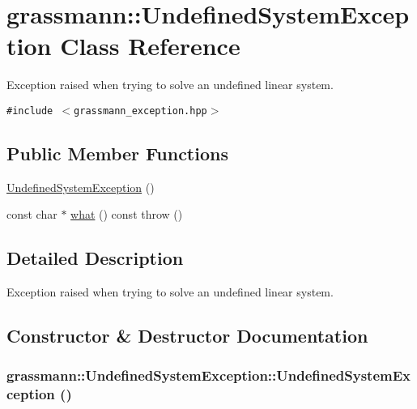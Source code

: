 \hypertarget{classgrassmann_1_1UndefinedSystemException}{
\section{grassmann::UndefinedSystemException Class Reference}
\label{classgrassmann_1_1UndefinedSystemException}
}
Exception raised when trying to solve an undefined linear system.  


{\tt \#include $<$grassmann\_\-exception.hpp$>$}

\subsection*{Public Member Functions}
\begin{CompactItemize}
\item 
\hyperlink{classgrassmann_1_1UndefinedSystemException_49bc0a7979db07f79413535926f5934e}{UndefinedSystemException} ()
\item 
const char $\ast$ \hyperlink{classgrassmann_1_1UndefinedSystemException_96dc5afc62b18e147c108dfd76b7a5d7}{what} () const   throw ()
\end{CompactItemize}


\subsection{Detailed Description}
Exception raised when trying to solve an undefined linear system. 

\subsection{Constructor \& Destructor Documentation}
\hypertarget{classgrassmann_1_1UndefinedSystemException_49bc0a7979db07f79413535926f5934e}{
\subsubsection[UndefinedSystemException]{\setlength{\rightskip}{0pt plus 5cm}grassmann::UndefinedSystemException::UndefinedSystemException ()}}
\label{classgrassmann_1_1UndefinedSystemException_49bc0a7979db07f79413535926f5934e}




